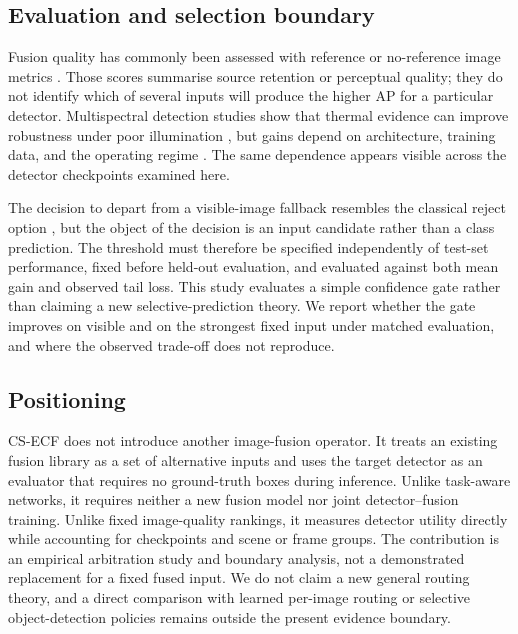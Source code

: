 \documentclass[preprint,11pt]{elsarticle}
\begin{document}
\subsection{Evaluation and selection boundary}

Fusion quality has commonly been assessed with reference or no-reference image
metrics \cite{ma2019survey,mudavath2026review}. Those scores summarise source
retention or perceptual quality; they do not identify which of several inputs
will produce the higher AP for a particular detector. Multispectral
detection studies show that thermal evidence can improve robustness under
poor illumination \cite{li2010thermal,guo2024prior}, but gains depend on
architecture, training data, and the operating regime
\cite{abdar2021uncertainty,gawlikowski2023uncertainty}. The same dependence appears
visible across the detector checkpoints examined here.

The decision to depart from a visible-image fallback resembles the classical
reject option \cite{chow1970reject}, but the object of the decision is an input
candidate rather than a class prediction. The threshold must therefore be
specified independently of test-set performance, fixed before held-out
evaluation, and
evaluated against both mean gain and observed tail loss. This study evaluates a
simple confidence gate rather than claiming a new selective-prediction theory.
We report whether the gate improves on visible and on the strongest fixed input
under matched evaluation, and where the observed trade-off does not reproduce.

\subsection{Positioning}

CS-ECF does not introduce another image-fusion operator. It treats an existing
fusion library as a set of alternative inputs and uses the target detector as
an evaluator that requires no ground-truth boxes during inference. Unlike
task-aware networks, it requires neither a new fusion model nor joint
detector--fusion training. Unlike fixed image-quality rankings, it measures
detector utility directly while accounting for checkpoints and scene or frame
groups. The contribution is an empirical arbitration study and boundary
analysis, not a demonstrated replacement for a fixed fused input. We do not
claim a new general routing theory, and a direct comparison with learned
per-image routing or selective object-detection policies remains outside the
present evidence boundary.
\end{document}
